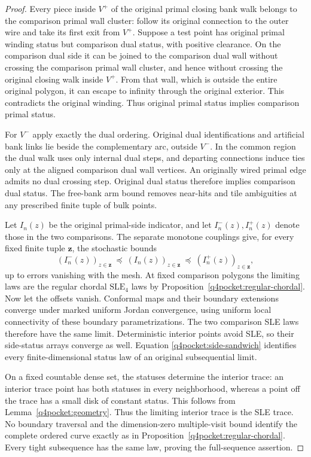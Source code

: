 \begin{proof}
Every piece inside $V^+$ of the original primal
closing bank walk belongs to the comparison primal
wall cluster: follow its original connection to
the outer wire and take its first exit from $V^+$.
Suppose a test point has original primal winding
status but comparison dual status, with positive
clearance.  On the comparison dual side it can be
joined to the comparison dual wall without crossing
the comparison primal wall cluster, and hence
without crossing the original closing walk inside
$V^+$.  From that wall, which is outside the entire
original polygon, it can escape to infinity through
the original exterior.  This contradicts the
original winding.  Thus original primal status
implies comparison primal status.

For $V^-$ apply exactly the dual ordering.  Original
dual identifications and artificial bank links lie
beside the complementary arc, outside $V^-$.  In
the common region the dual walk uses only internal
dual steps, and departing connections induce ties
only at the aligned comparison dual wall vertices.
An originally wired primal edge admits no dual
crossing step.  Original dual status therefore
implies comparison dual status.  The free-bank arm
bound removes near-hits and tile ambiguities at
any prescribed finite tuple of bulk points.

Let $I_n(z)$ be the original primal-side indicator,
and let $I_n^-(z),I_n^+(z)$ denote those in the
two comparisons.  The separate monotone couplings
give, for every fixed finite tuple $\boldsymbol z$,
the stochastic bounds
\begin{equation}
 (I_n^-(z))_{z\in\boldsymbol z}
 \ \preceq\
 (I_n(z))_{z\in\boldsymbol z}
 \ \preceq\
 (I_n^+(z))_{z\in\boldsymbol z},
 \label{q4pocket:side-sandwich}
\end{equation}
up to errors vanishing with the mesh.  At fixed
comparison polygons the limiting laws are the
regular chordal $\mathrm{SLE}_4$ laws by
Proposition~\ref{q4pocket:regular-chordal}.  Now let
the offsets vanish.  Conformal maps and their
boundary extensions converge under marked uniform
Jordan convergence, using uniform local connectivity
of these boundary parametrizations.  The two
comparison SLE laws therefore have the same limit.
Deterministic interior points avoid SLE, so their
side-status arrays converge as well.  Equation
\eqref{q4pocket:side-sandwich} identifies every
finite-dimensional status law of an original
subsequential limit.

On a fixed countable dense set, the statuses
determine the interior trace: an interior trace
point has both statuses in every neighborhood,
whereas a point off the trace has a small disk
of constant status.  This follows from
Lemma~\ref{q4pocket:geometry}.  Thus the limiting
interior trace is the SLE trace.  No boundary
traversal and the dimension-zero multiple-visit
bound identify the complete ordered curve exactly
as in Proposition~\ref{q4pocket:regular-chordal}.
Every tight subsequence has the same law, proving
the full-sequence assertion.
\end{proof}
